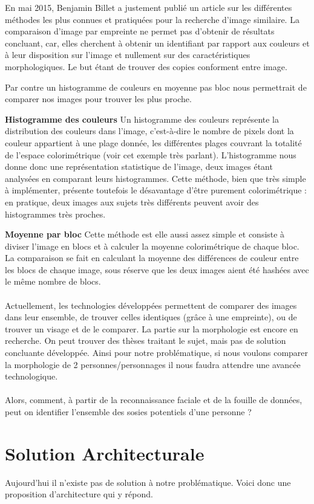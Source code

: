 \documentclass[a4paper,12pt]{article}
\begin{document}
En mai 2015, Benjamin Billet a justement publié un article sur les différentes méthodes les plus connues et pratiquées pour la recherche d'image similaire. La comparaison d'image par empreinte ne permet pas d'obtenir de résultats concluant, car, elles cherchent à obtenir un identifiant par rapport aux couleurs et à leur disposition sur l'image et nullement sur des caractéristiques morphologiques. Le but étant de trouver des copies conforment entre image. 

Par contre un histogramme de couleurs en moyenne pas bloc nous permettrait de comparer nos images pour trouver les plus proche. 

\textbf{Histogramme des couleurs}
Un histogramme des couleurs représente la distribution des couleurs dans l'image, c'est-à-dire le nombre de pixels dont la couleur appartient à une plage donnée, les différentes plages couvrant la totalité de l'espace colorimétrique (voir cet exemple très parlant). L'histogramme nous donne donc une représentation statistique de l'image, deux images étant analysées en comparant leurs histogrammes. Cette méthode, bien que très simple à implémenter, présente toutefois le désavantage d'être purement colorimétrique : en pratique, deux images aux sujets très différents peuvent avoir des histogrammes très proches.

\textbf{Moyenne par bloc}
Cette méthode est elle aussi assez simple et consiste à diviser l'image en blocs et à calculer la moyenne colorimétrique de chaque bloc. La comparaison se fait en calculant la moyenne des différences de couleur entre les blocs de chaque image, sous réserve que les deux images aient été hashées avec le même nombre de blocs. 
\\\\
Actuellement, les technologies développées permettent de comparer des images dans leur ensemble, de trouver celles identiques (grâce à une empreinte), ou de trouver un visage et de le comparer. La partie sur la morphologie est encore en recherche. On peut trouver des thèses traitant le sujet, mais pas de solution concluante développée. Ainsi pour notre problématique, si nous voulons comparer la morphologie de 2 personnes/personnages il nous faudra attendre une avancée technologique. 
\\\\
Alors, comment, à partir de la reconnaissance faciale et de la fouille de données, peut on identifier l’ensemble des sosies potentiels d’une personne ?

\section{Solution Architecturale}
Aujourd'hui il n'existe pas de solution à notre problématique. Voici donc une proposition d'architecture qui y répond. 
\end{document}
